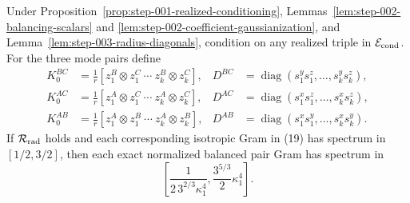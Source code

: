 \begin{proposition}
\label{prop:step-003-elliptic-transfer}
Under Proposition~\ref{prop:step-001-realized-conditioning},
Lemmas~\ref{lem:step-002-balancing-scalars} and
\ref{lem:step-002-coefficient-gaussianization}, and
Lemma~\ref{lem:step-003-radius-diagonals}, condition on any realized triple
in \(\mathcal E_{\rm cond}\). For the three mode pairs define
\[
  \begin{aligned}
  K_0^{BC}&=\frac1r[z_1^B\otimes z_1^C\ \cdots\ z_k^B\otimes z_k^C],
  &D^{BC}&=\operatorname{diag}(s_1^ys_1^z,\ldots,s_k^ys_k^z),\\
  K_0^{AC}&=\frac1r[z_1^A\otimes z_1^C\ \cdots\ z_k^A\otimes z_k^C],
  &D^{AC}&=\operatorname{diag}(s_1^xs_1^z,\ldots,s_k^xs_k^z),\\
  K_0^{AB}&=\frac1r[z_1^A\otimes z_1^B\ \cdots\ z_k^A\otimes z_k^B],
  &D^{AB}&=\operatorname{diag}(s_1^xs_1^y,\ldots,s_k^xs_k^y).
  \end{aligned}                                             \tag{19}
\]
If \(\mathcal R_{\rm rad}\) holds and each corresponding isotropic Gram in
(19) has spectrum in \([1/2,3/2]\), then each exact normalized balanced pair
Gram has spectrum in
\[
  \left[
    \frac1{2\,3^{2/3}\kappa_1^4},
    \frac{3^{5/3}}2\kappa_1^4
  \right].                                                  \tag{20}
\]

\end{proposition}

